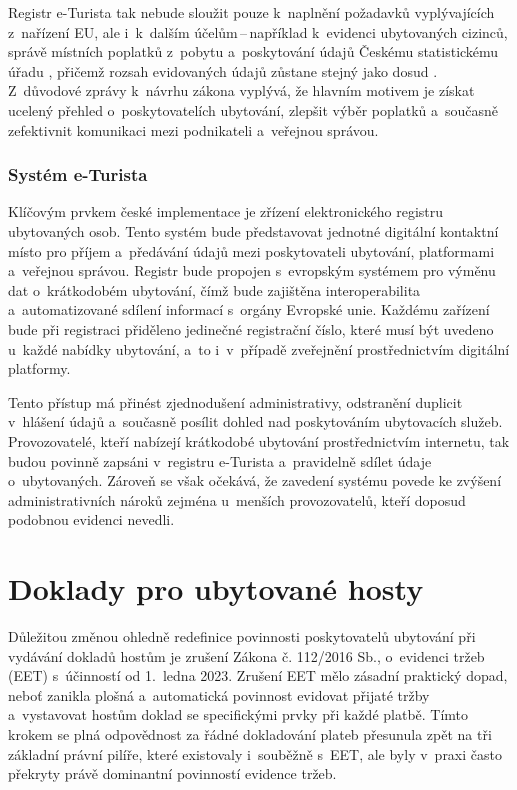 Registr e-Turista tak nebude sloužit pouze k~naplnění požadavků vyplývajících z~nařízení EU, ale i~k~dalším účelům\,--\,například k~evidenci ubytovaných cizinců, správě místních poplatků z~pobytu a~poskytování údajů Českému statistickému úřadu \cite[A 1]{cz-gov-turism}, přičemž rozsah evidovaných údajů zůstane stejný jako dosud \cite[A 9]{cz-gov-turism}.
Z~důvodové zprávy k~návrhu zákona vyplývá, že hlavním motivem je získat ucelený přehled o~poskytovatelích ubytování, zlepšit výběr poplatků a~současně zefektivnit komunikaci mezi podnikateli a~veřejnou správou.

\subsubsection*{Systém e-Turista}
Klíčovým prvkem české implementace je zřízení elektronického registru ubytovaných osob.
Tento systém bude představovat jednotné digitální kontaktní místo pro příjem a~předávání údajů mezi poskytovateli ubytování, platformami a~veřejnou správou.
Registr bude propojen s~evropským systémem pro výměnu dat o~krátkodobém ubytování, čímž bude zajištěna interoperabilita a~automatizované sdílení informací s~orgány Evropské unie.
Každému zařízení bude při registraci přiděleno jedinečné registrační číslo, které musí být uvedeno u~každé nabídky ubytování, a~to i~v~případě zveřejnění prostřednictvím digitální platformy.

Tento přístup má přinést zjednodušení administrativy, odstranění duplicit v~hlášení údajů a~současně posílit dohled nad poskytováním ubytovacích služeb.
Provozovatelé, kteří nabízejí krátkodobé ubytování prostřednictvím internetu, tak budou povinně zapsáni v~registru e-Turista a~pravidelně sdílet údaje o~ubytovaných.
Zároveň se však očekává, že zavedení systému povede ke zvýšení administrativních nároků zejména u~menších provozovatelů, kteří doposud podobnou evidenci nevedli.


\section{Doklady pro ubytované hosty}
\label{sec:01-documents}
Důležitou změnou ohledně redefinice povinnosti poskytovatelů ubytování při vydávání dokladů hostům je zrušení Zákona č. 112/2016 Sb., o~evidenci tržeb (EET) s~účinností od 1.~ledna 2023.
Zrušení EET mělo zásadní praktický dopad, neboť zanikla plošná a~automatická povinnost evidovat přijaté tržby a~vystavovat hostům doklad se specifickými prvky při každé platbě.
Tímto krokem se plná odpovědnost za řádné dokladování plateb přesunula zpět na tři základní právní pilíře, které existovaly i~souběžně s~EET, ale byly v~praxi často překryty právě dominantní povinností evidence tržeb.

